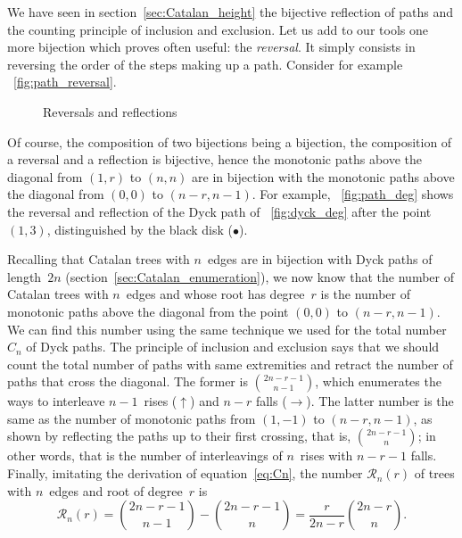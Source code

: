We have seen in section~\vref{sec:Catalan_height} the bijective
reflection of paths and the counting principle of inclusion and
exclusion. Let us add to our tools one more bijection which proves
often useful: the \emph{reversal}. It simply consists in reversing the
order of the steps making up a path. Consider for example
\fig~\ref{fig:path_reversal}.
\begin{figure}
\centering
{}
\qquad
{}
\caption{Reversals and reflections}
\end{figure}
Of course, the composition of two bijections being a bijection, the
composition of a reversal and a reflection is bijective, hence the
monotonic paths above the diagonal from \((1,r)\) to \((n,n)\) are in
bijection with the monotonic paths above the diagonal from \((0,0)\)
to \((n-r,n-1)\). For example, \fig~\ref{fig:path_deg} shows the
reversal and reflection of the Dyck path of \fig~\ref{fig:dyck_deg}
after the point \((1,3)\), distinguished by the black disk
(\(\bullet\)).

Recalling that Catalan trees with \(n\)~edges are in bijection with
Dyck paths of length~\(2n\) (section~\vref{sec:Catalan_enumeration}),
we now know that the number of Catalan trees with \(n\)~edges and
whose root has degree~\(r\) is the number of monotonic paths above the
diagonal from the point \((0,0)\) to \((n-r,n-1)\). We can find this
number using the same technique we used for the total number~\(C_n\)
of Dyck paths. The principle of inclusion and exclusion says that we
should count the total number of paths with same extremities and
retract the number of paths that cross the diagonal. The former is
\(\binom{2n-r-1}{n-1}\), which enumerates the ways to interleave
\(n-1\)~rises (\(\uparrow\)) and \(n-r\) falls (\(\rightarrow\)). The
latter number is the same as the number of monotonic paths from
\((1,-1)\) to \((n-r,n-1)\), as shown by reflecting the paths up to
their first crossing, that is, \(\binom{2n-r-1}{n}\); in other words,
that is the number of interleavings of \(n\)~rises with \(n-r-1\)
falls. Finally, imitating the derivation of equation~\eqref{eq:Cn},
the number \(\mathcal{R}_n(r)\) of trees with \(n\)~edges and root of
degree~\(r\) is
\begin{equation*}
\mathcal{R}_n(r) = \binom{2n-r-1}{n-1} - \binom{2n-r-1}{n}
                 = \frac{r}{2n-r} \binom{2n-r}{n}.
\end{equation*}


